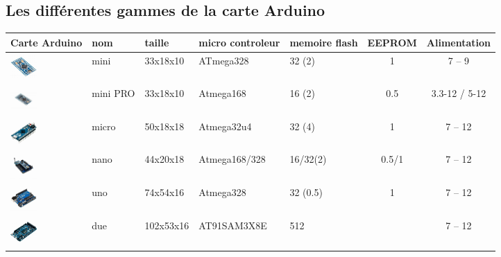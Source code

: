 \documentclass[12pt, openany]{report}
\begin{document}
\subsection {Les différentes gammes de la carte Arduino}
\newpage
\begin{table}[!h]


{\large }
\begin{tabular}{|p{}|p{}|p{2cm}|p{3cm}|p{2cm}|c|c||}
\hline Carte Arduino & nom  & taille & micro controleur &memoire flash  & EEPROM & Alimentation

 \\
\hline  \includegraphics[height=1cm,width=1cm]{arduino_gamme/mini.jpg}& mini & 33x18x10   & ATmega328   & 32 (2) & 1  &7 – 9    \\
\hline  \includegraphics[height=1cm,width=1cm]{arduino_gamme/minipro.png}& mini PRO&  33x18x10
& Atmega168 & 16 (2) & 0.5 &
3.3-12 / 5-12   \\
\hline  \includegraphics[height=1cm,width=1cm]{arduino_gamme/micro.jpg} & micro & 50x18x18 & Atmega32u4
& 32 (4) & 1 & 7 – 12 \\
\hline  \includegraphics[height=1cm,width=1cm]{arduino_gamme/nano.jpg} & nano & 44x20x18 & Atmega168/328 & 16/32(2) &  0.5/1 & 7 – 12 \\
\hline  \includegraphics[height=1cm,width=1cm]{arduino_gamme/uno.png} & uno & 74x54x16 & Atmega328 & 32 (0.5) & 1
& 7 – 12   \\
\hline  \includegraphics[height=1cm,width=1cm]{arduino_gamme/due.jpg} & due & 102x53x16 & AT91SAM3X8E & 512 &  &
7 – 12  \\

\end{tabular}
\end{table}
\end{document}

